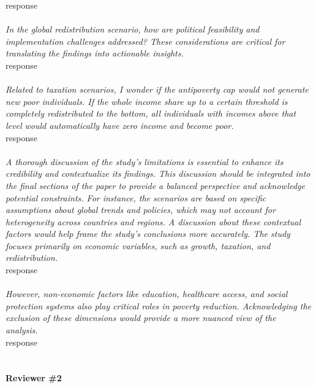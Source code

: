 \documentclass[12pt,english]{article}
\begin{document}
response
~\\ ~\\

\textit{In the global redistribution scenario, how are political feasibility and implementation challenges addressed? These considerations are critical for translating the findings into actionable insights. }~\\

response
~\\ ~\\

\textit{Related to taxation scenarios, I wonder if the antipoverty cap would not generate new poor individuals. If the whole income share up to a certain threshold is completely redistributed to the bottom, all individuals with incomes above that level would automatically have zero income and become poor. }~\\

response
~\\ ~\\

\textit{A thorough discussion of the study's limitations is essential to enhance its credibility and contextualize its findings. This discussion should be integrated into the final sections of the paper to provide a balanced perspective and acknowledge potential constraints. For instance, the scenarios are based on specific assumptions about global trends and policies, which may not account for heterogeneity across countries and regions. A discussion about these contextual factors would help frame the study's conclusions more accurately. The study focuses primarily on economic variables, such as growth, taxation, and redistribution. }~\\

response
~\\ ~\\

\textit{However, non-economic factors like education, healthcare access, and social protection systems also play critical roles in poverty reduction. Acknowledging the exclusion of these dimensions would provide a more nuanced view of the analysis.}~\\

response
~\\ ~\\


\paragraph*{Reviewer \#2}
\end{document}
